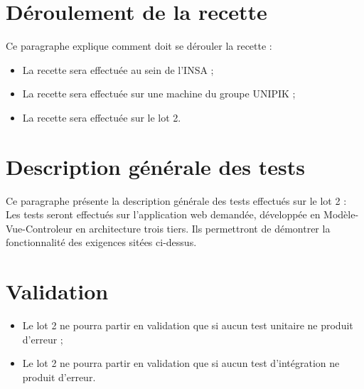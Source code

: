 \section{Déroulement de la recette}
	Ce paragraphe explique comment doit se dérouler la recette : 
	\begin{itemize}
		\item La recette sera effectuée au sein de l'INSA ;
		\item La recette sera effectuée sur une machine du groupe UNIPIK ;
		\item La recette sera effectuée sur le lot 2.
	\end{itemize}

\section{Description générale des tests}
	Ce paragraphe présente la description générale des tests effectués sur le lot 2 :	\\
	
	Les tests seront effectués sur l'application web demandée, développée en Modèle-Vue-Controleur en architecture trois tiers. Ils permettront de démontrer la fonctionnalité des exigences sitées ci-dessus.

\section{Validation}	
	\begin{itemize}
		\item Le lot 2 ne pourra partir en validation que si aucun test unitaire ne produit d'erreur ;
		\item Le lot 2 ne pourra partir en validation que si aucun test d’intégration ne produit d'erreur.
	\end{itemize}
	
